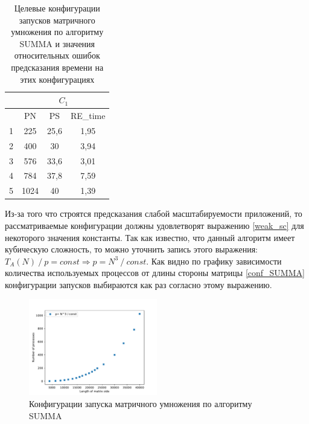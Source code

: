 		\begin{table}
			\centering
			\begin{tabular}{|r|c|c|c|}
			\hline
			            & \multicolumn{3}{|c|}{\(C_1\)} \\ \hline
			\textnumero & PN   & PS   & RE\_time        \\ \hline
			1           & 225  & 25,6 & 1,95            \\ \hline
			2           & 400  & 30   & 3,94            \\ \hline
			3           & 576  & 33,6 & 3,01            \\ \hline
			4           & 784  & 37,8 & 7,59            \\ \hline
			5           & 1024 & 40   & 1,39            \\ \hline
			\end{tabular}
			\caption{Целевые конфигурации запусков матричного умножения по алгоритму SUMMA и значения относительных ошибок предсказания времени на этих конфигурациях}
			\label{target_SUMMA}
		\end{table}
		Из-за того что строятся предсказания слабой масштабируемости приложений, то рассматриваемые конфигурации должны удовлетворят выражению \eqref{weak_sc} для некоторого значения константы. Так как известно, что данный алгоритм имеет кубическую сложность, то можно уточнить запись этого выражения: \(T_A(N)\:/\:p = const \Rightarrow p = N^3\:/\:const\). Как видно по графику зависимости количества используемых процессов от длины стороны матрицы \eqref{conf_SUMMA} конфигурации запусков выбираются как раз согласно этому выражению.

		\begin{figure}
			\centering
			\includegraphics[width=0.5\textwidth]{./images/conf_SUMMA}
			\caption{Конфигурации запуска матричного умножения по алгоритму SUMMA}
			\label{conf_SUMMA}
		\end{figure}

